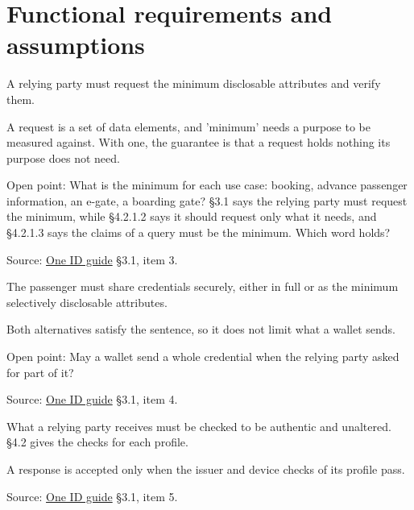 
\section{Functional requirements and assumptions}

\begin{definition}
  \label{def:c11}
  \notready
  A relying party must request the minimum disclosable attributes and verify
  them.

  A request is a set of data elements, and 'minimum' needs a purpose to be
  measured against. With one, the guarantee is that a request holds nothing
  its purpose does not need.

  Open point: What is the minimum for each use case: booking, advance
  passenger information, an e-gate, a boarding gate? §3.1 says the relying
  party must request the minimum, while §4.2.1.2 says it should request only
  what it needs, and §4.2.1.3 says the claims of a query must be the minimum.
  Which word holds?

  Source:
  \href{https://standards.atlassian.net/wiki/spaces/OneID/pages/2947416082/Technical+Implementation+Guide}{One
  ID guide} §3.1, item 3.
\end{definition}

\begin{definition}
  \label{def:c12}
  \notready
  The passenger must share credentials securely, either in full or as the
  minimum selectively disclosable attributes.

  Both alternatives satisfy the sentence, so it does not limit what a wallet
  sends.

  Open point: May a wallet send a whole credential when the relying party
  asked for part of it?

  Source:
  \href{https://standards.atlassian.net/wiki/spaces/OneID/pages/2947416082/Technical+Implementation+Guide}{One
  ID guide} §3.1, item 4.
\end{definition}

\begin{definition}
  \label{def:c13}
  What a relying party receives must be checked to be authentic and
  unaltered. §4.2 gives the checks for each profile.

  A response is accepted only when the issuer and device checks of its
  profile pass.

  Source:
  \href{https://standards.atlassian.net/wiki/spaces/OneID/pages/2947416082/Technical+Implementation+Guide}{One
  ID guide} §3.1, item 5.
\end{definition}

